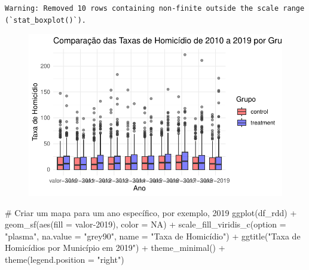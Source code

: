 \documentclass[
  letterpaper,
  DIV=11,
  numbers=noendperiod]{scrartcl}
\newenvironment{Shaded}{\begin{snugshade}}{\end{snugshade}}
\newcommand{\AttributeTok}[1]{\textcolor[rgb]{0.40,0.45,0.13}{#1}}
\newcommand{\CommentTok}[1]{\textcolor[rgb]{0.37,0.37,0.37}{#1}}
\newcommand{\ConstantTok}[1]{\textcolor[rgb]{0.56,0.35,0.01}{#1}}
\newcommand{\FunctionTok}[1]{\textcolor[rgb]{0.28,0.35,0.67}{#1}}
\newcommand{\NormalTok}[1]{\textcolor[rgb]{0.00,0.23,0.31}{#1}}
\newcommand{\SpecialCharTok}[1]{\textcolor[rgb]{0.37,0.37,0.37}{#1}}
\newcommand{\StringTok}[1]{\textcolor[rgb]{0.13,0.47,0.30}{#1}}
\begin{document}
\begin{verbatim}
Warning: Removed 10 rows containing non-finite outside the scale range
(`stat_boxplot()`).
\end{verbatim}

\begin{figure}[H]

{\centering \includegraphics{maps_files/figure-pdf/unnamed-chunk-22-1.pdf}

}

\end{figure}

\begin{Shaded}
\begin{Highlighting}[]
\CommentTok{\# Criar um mapa para um ano específico, por exemplo, 2019}
\FunctionTok{ggplot}\NormalTok{(df\_rdd) }\SpecialCharTok{+}
  \FunctionTok{geom\_sf}\NormalTok{(}\FunctionTok{aes}\NormalTok{(}\AttributeTok{fill =} \StringTok{\textasciigrave{}}\AttributeTok{valor{-}2019}\StringTok{\textasciigrave{}}\NormalTok{), }\AttributeTok{color =} \ConstantTok{NA}\NormalTok{) }\SpecialCharTok{+}
  \FunctionTok{scale\_fill\_viridis\_c}\NormalTok{(}\AttributeTok{option =} \StringTok{"plasma"}\NormalTok{, }\AttributeTok{na.value =} \StringTok{"grey90"}\NormalTok{, }\AttributeTok{name =} \StringTok{"Taxa de Homicídio"}\NormalTok{) }\SpecialCharTok{+}
  \FunctionTok{ggtitle}\NormalTok{(}\StringTok{"Taxa de Homicídios por Município em 2019"}\NormalTok{) }\SpecialCharTok{+}
  \FunctionTok{theme\_minimal}\NormalTok{() }\SpecialCharTok{+}
  \FunctionTok{theme}\NormalTok{(}\AttributeTok{legend.position =} \StringTok{"right"}\NormalTok{)}
\end{Highlighting}
\end{Shaded}
\end{document}
